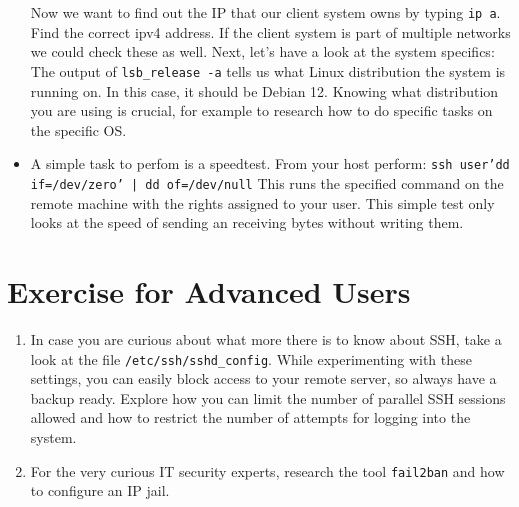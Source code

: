 \documentclass{dcbl/challenge}
\begin{document}
\begin{aufgabe}
\begin{itemize}
        Now we want to find out the IP that our client system owns by typing \texttt{ip a}. Find the correct ipv4 address. If the client system is part of multiple networks we could check these as well. 
        Next, let's have a look at the system specifics: The output of \texttt{lsb\_release -a} tells us what Linux distribution the system is running on. In this case, it should be Debian 12.
        Knowing what distribution you are using is crucial, for example to research how to do specific tasks on the specific OS.
    \item A simple task to perfom is a speedtest. From your host perform: \texttt{ssh user\@remote 'dd if=/dev/zero' | dd of=/dev/null} This runs the specified command on the remote machine with the rights assigned to your user. This simple test only looks at the speed of sending an receiving bytes without writing them.
    
\end{itemize}
\end{aufgabe}

\section*{Exercise for Advanced Users}
\begin{enumerate}
    \item In case you are curious about what more there is to know about SSH, take a look at the file \texttt{/etc/ssh/sshd\_config}. While experimenting with these settings, you can easily block access to your remote server, so always have a backup ready. Explore how you can limit the number of parallel SSH sessions allowed and how to restrict the number of attempts for logging into the system.

    \item For the very curious IT security experts, research the tool \texttt{fail2ban} and how to configure an IP jail.
\end{enumerate}
\end{document}
